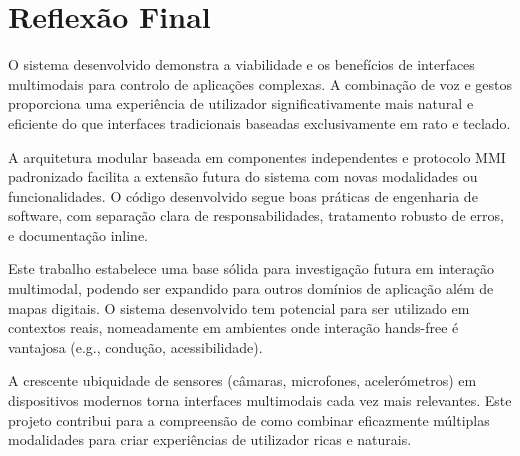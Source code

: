 \documentclass{report}
\begin{document}

\section{Reflexão Final}

O sistema desenvolvido demonstra a viabilidade e os benefícios de interfaces multimodais para controlo de aplicações complexas. A combinação de voz e gestos proporciona uma experiência de utilizador significativamente mais natural e eficiente do que interfaces tradicionais baseadas exclusivamente em rato e teclado.

A arquitetura modular baseada em componentes independentes e protocolo MMI padronizado facilita a extensão futura do sistema com novas modalidades ou funcionalidades. O código desenvolvido segue boas práticas de engenharia de software, com separação clara de responsabilidades, tratamento robusto de erros, e documentação inline.

Este trabalho estabelece uma base sólida para investigação futura em interação multimodal, podendo ser expandido para outros domínios de aplicação além de mapas digitais. O sistema desenvolvido tem potencial para ser utilizado em contextos reais, nomeadamente em ambientes onde interação hands-free é vantajosa (e.g., condução, acessibilidade).

A crescente ubiquidade de sensores (câmaras, microfones, acelerómetros) em dispositivos modernos torna interfaces multimodais cada vez mais relevantes. Este projeto contribui para a compreensão de como combinar eficazmente múltiplas modalidades para criar experiências de utilizador ricas e naturais.


\printbibliography
\end{document}
